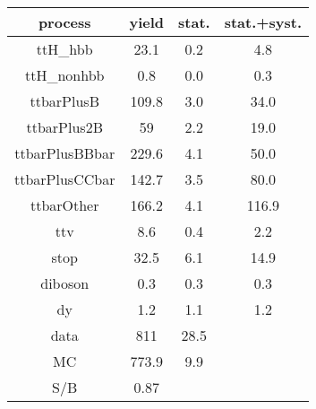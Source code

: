 \begin{tabular}{cccc}
\hline
    process     &  yield  &  stat.  &  stat.+syst.  \\
\hline
    ttH\_hbb     &  23.1   &   0.2   &      4.8      \\
   ttH\_nonhbb   &   0.8   &   0.0   &      0.3      \\
   ttbarPlusB   &  109.8  &   3.0   &     34.0      \\
  ttbarPlus2B   &   59    &   2.2   &     19.0      \\
 ttbarPlusBBbar &  229.6  &   4.1   &     50.0      \\
 ttbarPlusCCbar &  142.7  &   3.5   &     80.0      \\
   ttbarOther   &  166.2  &   4.1   &     116.9     \\
      ttv       &   8.6   &   0.4   &      2.2      \\
      stop      &  32.5   &   6.1   &     14.9      \\
    diboson     &   0.3   &   0.3   &      0.3      \\
       dy       &   1.2   &   1.1   &      1.2      \\
\hline
      data      &   811   &  28.5   &               \\
       MC       &  773.9  &   9.9   &               \\
\hline
      S/B       &  0.87   &         &               \\
\hline
\end{tabular}
